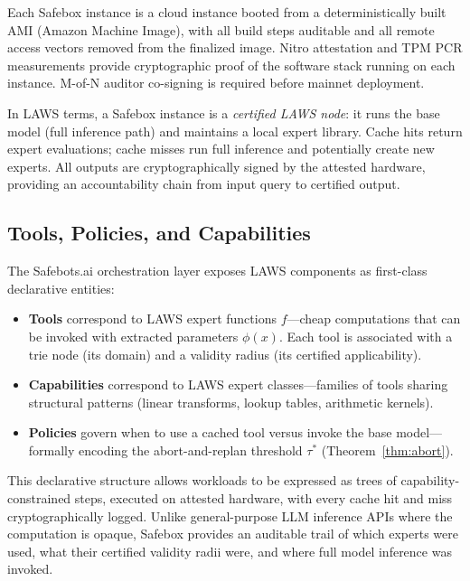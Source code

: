 \documentclass[11pt]{article}
\begin{document}
Each Safebox instance is a cloud instance booted from a deterministically built
AMI (Amazon Machine Image), with all build steps auditable and all remote access
vectors removed from the finalized image.  Nitro attestation and TPM PCR
measurements provide cryptographic proof of the software stack running on each
instance.  M-of-N auditor co-signing is required before mainnet deployment.

In LAWS terms, a Safebox instance is a \emph{certified LAWS node}: it runs the
base model (full inference path) and maintains a local expert library.
Cache hits return expert evaluations; cache misses run full inference and
potentially create new experts.  All outputs are cryptographically signed by
the attested hardware, providing an accountability chain from input query to
certified output.

\subsection{Tools, Policies, and Capabilities}

The Safebots.ai orchestration layer exposes LAWS components as first-class
declarative entities:

\begin{itemize}[leftmargin=2em]
  \item \textbf{Tools} correspond to LAWS expert functions $f$---cheap
        computations that can be invoked with extracted parameters $\phi(x)$.
        Each tool is associated with a trie node (its domain) and a validity
        radius (its certified applicability).
  \item \textbf{Capabilities} correspond to LAWS expert classes---families
        of tools sharing structural patterns (linear transforms, lookup tables,
        arithmetic kernels).
  \item \textbf{Policies} govern when to use a cached tool versus invoke the
        base model---formally encoding the abort-and-replan threshold
        $\tau^*$ (Theorem~\ref{thm:abort}).
\end{itemize}

This declarative structure allows workloads to be expressed as trees of
capability-constrained steps, executed on attested hardware, with every
cache hit and miss cryptographically logged.  Unlike general-purpose LLM
inference APIs where the computation is opaque, Safebox provides an auditable
trail of which experts were used, what their certified validity radii were, and
where full model inference was invoked.
\end{document}
